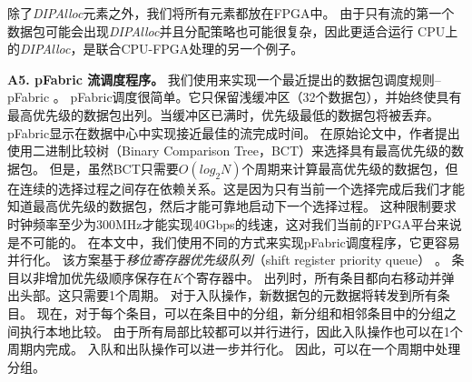 除了\textit {DIPAlloc}元素之外，我们将所有元素都放在FPGA中。
由于只有流的第一个数据包可能会出现\textit {DIPAlloc}并且分配策略也可能很复杂，因此更适合运行
CPU上的\textit {DIPAlloc}，是联合CPU-FPGA处理的另一个例子。

%



\textbf {A5. pFabric 流调度程序。}
我们使用\name 来实现一个最近提出的数据包调度规则--pFabric \cite {pfabric}。
pFabric调度很简单。它只保留浅缓冲区（32个数据包），并始终使具有最高优先级的数据包出列。当缓冲区已满时，优先级最低的数据包将被丢弃。
pFabric显示在数据中心中实现接近最佳的流完成时间。
在原始论文中，作者提出使用二进制比较树（Binary Comparison Tree，BCT）来选择具有最高优先级的数据包。
但是，虽然BCT只需要$O(log_2 N)$个周期来计算最高优先级的数据包，但在连续的选择过程之间存在依赖关系。这是因为只有当前一个选择完成后我们才能知道最高优先级的数据包，然后才能可靠地启动下一个选择过程。
这种限制要求时钟频率至少为300MHz才能实现40Gbps的线速，这对我们当前的FPGA平台来说是不可能的。
在本文中，我们使用不同的方式来实现pFabric调度程序，它更容易并行化。
该方案基于\textit{移位寄存器优先级队列}（shift register priority queue） \cite {moon2000scalable}。
条目以非增加优先级顺序保存在$K$个寄存器中。
出列时，所有条目都向右移动并弹出头部。这只需要1个周期。
对于入队操作，新数据包的元数据将转发到所有条目。
现在，对于每个条目，可以在条目中的分组，新分组和相邻条目中的分组之间执行本地比较。
由于所有局部比较都可以并行进行，因此入队操作也可以在1个周期内完成。
入队和出队操作可以进一步并行化。
因此，可以在一个周期中处理分组。

